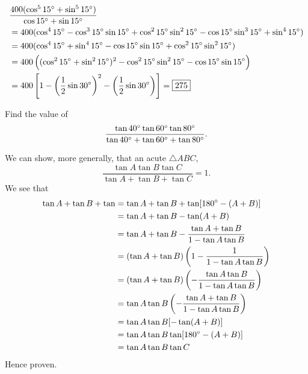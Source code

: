 \begin{solution}
\begin{align*}
&\frac{400(\cos^515\degree+\sin^515\degree)}{\cos15\degree+\sin15\degree} \\
&= 400(\cos^415\degree-\cos^315\degree\sin15\degree+\cos^215\degree\sin^215\degree-\cos15\degree\sin^315\degree+\sin^415\degree) \\
&= 400(\cos^415\degree+\sin^415\degree-\cos15\degree\sin15\degree+\cos^215\degree\sin^215\degree) \\
&= 400\left((\cos^215\degree+\sin^215\degree)^2-\cos^215\degree\sin^215\degree-\cos15\degree\sin15\degree\right) \\
&= 400\left[1-\left(\frac{1}{2}\sin30\degree\right)^2-\left(\frac{1}{2}\sin30\degree\right)\right]=\boxed{275}
\end{align*}
\end{solution}

\begin{prbm}
Find the value of
\[ \frac{\tan40\degree\tan60\degree\tan80\degree}{\tan40\degree+\tan60\degree+\tan80\degree}. \]
\end{prbm}
\begin{solution}
We can show, more generally, that an acute $\triangle ABC$,
\[ \frac{\tan A\tan B\tan C}{\tan A+\tan B+\tan C}=1. \]
We see that
\begin{align*}
\tan A+\tan B+\tan 
&= \tan A+\tan B+\tan[180\degree-(A+B)] \\
&= \tan A+\tan B-\tan(A+B) \\
&= \tan A+\tan B-\frac{\tan A+\tan B}{1-\tan A\tan B} \\
&= (\tan A+\tan B)\left(1-\frac{1}{1-\tan A\tan B}\right) \\
&= (\tan A+\tan B)\left(-\frac{\tan A\tan B}{1-\tan A\tan B}\right) \\
&= \tan A\tan B\left(-\frac{\tan A+\tan B}{1-\tan A\tan B}\right) \\
&= \tan A\tan B[-\tan(A+B)] \\
&= \tan A\tan B\tan[180\degree-(A+B)] \\
&= \tan A\tan B\tan C
\end{align*}
Hence proven.
\end{solution}
\pagebreak


